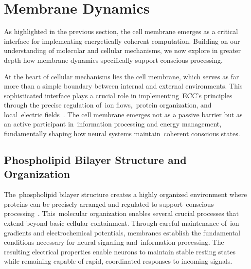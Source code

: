\section{Membrane Dynamics~}

As highlighted in the previous section, the cell membrane emerges as a critical interface for implementing energetically coherent computation. Building on our understanding of molecular and cellular mechanisms, we now explore in greater depth how membrane dynamics specifically support conscious processing.

At the heart of cellular mechanisms lies the cell membrane, which serves as far more than a simple boundary between internal and external environments. This sophisticated interface plays a crucial role in implementing~ECC's principles through the precise regulation of~ion flows,~protein organization, and local~electric fields~\cite{Andersen1992, Bezanilla2002}. The cell membrane emerges not as a passive barrier but as an active participant in~information processing and energy management, fundamentally shaping how neural systems maintain~coherent conscious states.

\subsection*{Phospholipid Bilayer Structure and Organization~}

The~phospholipid bilayer structure creates a highly organized environment where proteins can be precisely arranged and regulated to support~conscious processing~\cite{Goni2014, Lingwood2010}. This~molecular organization enables several crucial processes that extend beyond basic cellular containment. Through careful maintenance of~ion gradients and electrochemical potentials, membranes establish the fundamental conditions necessary for neural signaling and~information processing. The resulting electrical properties enable neurons to maintain stable resting states while remaining capable of rapid, coordinated responses to incoming signals.

